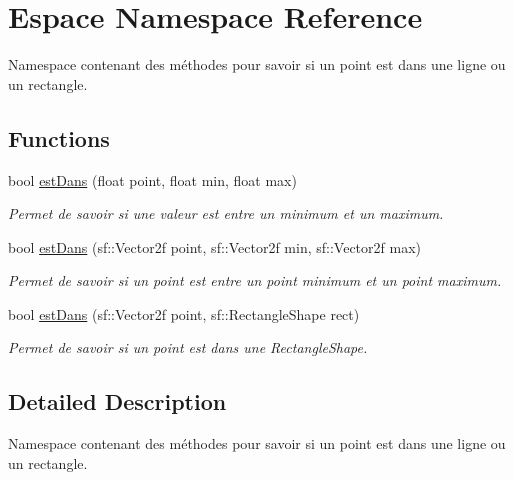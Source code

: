 \hypertarget{namespaceEspace}{\section{Espace Namespace Reference}
\label{namespaceEspace}
}


Namespace contenant des méthodes pour savoir si un point est dans une ligne ou un rectangle.  


\subsection*{Functions}
\begin{DoxyCompactItemize}
\item 
bool \hyperlink{namespaceEspace_a833b222902cce23430bfd8223d626bc6}{est\-Dans} (float point, float min, float max)
\begin{DoxyCompactList}\small\item\em Permet de savoir si une valeur est entre un minimum et un maximum. \end{DoxyCompactList}\item 
bool \hyperlink{namespaceEspace_ac526443f1a1600f714ae64d0ed22e603}{est\-Dans} (sf\-::\-Vector2f point, sf\-::\-Vector2f min, sf\-::\-Vector2f max)
\begin{DoxyCompactList}\small\item\em Permet de savoir si un point est entre un point minimum et un point maximum. \end{DoxyCompactList}\item 
bool \hyperlink{namespaceEspace_a1b183d2e4bebcd1a657cd63397c7a195}{est\-Dans} (sf\-::\-Vector2f point, sf\-::\-Rectangle\-Shape rect)
\begin{DoxyCompactList}\small\item\em Permet de savoir si un point est dans une Rectangle\-Shape. \end{DoxyCompactList}\end{DoxyCompactItemize}


\subsection{Detailed Description}
Namespace contenant des méthodes pour savoir si un point est dans une ligne ou un rectangle. 

